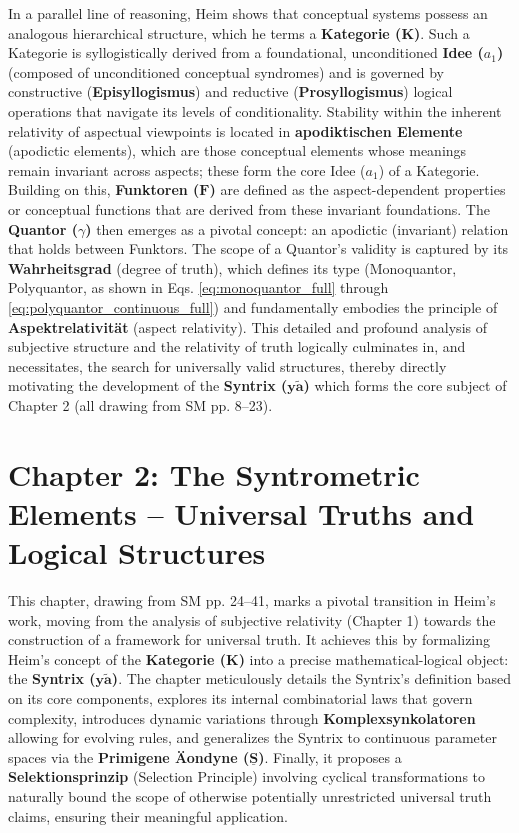 \documentclass[12pt]{article}
\newcommand{\kategorie}{\bm{K}}
\newcommand{\syntrix}{\bm{y\widetilde{a}}}
\newcommand{\conceptualsyndrome}{a} %
\newcommand{\funktor}{\bm{F}}
\begin{document}
In a parallel line of reasoning, Heim shows that conceptual systems possess an analogous hierarchical structure, which he terms a \textbf{Kategorie (\(\kategorie\))}. Such a Kategorie is syllogistically derived from a foundational, unconditioned \textbf{Idee (\(\conceptualsyndrome_1\))} (composed of unconditioned conceptual syndromes) and is governed by constructive (\textbf{Episyllogismus}) and reductive (\textbf{Prosyllogismus}) logical operations that navigate its levels of conditionality. Stability within the inherent relativity of aspectual viewpoints is located in \textbf{apodiktischen Elemente} (apodictic elements), which are those conceptual elements whose meanings remain invariant across aspects; these form the core Idee (\(\conceptualsyndrome_1\)) of a Kategorie. Building on this, \textbf{Funktoren (\(\funktor\))} are defined as the aspect-dependent properties or conceptual functions that are derived from these invariant foundations. The \textbf{Quantor (\(\gamma\))} then emerges as a pivotal concept: an apodictic (invariant) relation that holds between Funktors. The scope of a Quantor's validity is captured by its \textbf{Wahrheitsgrad} (degree of truth), which defines its type (Monoquantor, Polyquantor, as shown in Eqs. \eqref{eq:monoquantor_full} through \eqref{eq:polyquantor_continuous_full}) and fundamentally embodies the principle of \textbf{Aspektrelativität} (aspect relativity). This detailed and profound analysis of subjective structure and the relativity of truth logically culminates in, and necessitates, the search for universally valid structures, thereby directly motivating the development of the \textbf{Syntrix (\(\syntrix\))} which forms the core subject of Chapter 2 (all drawing from SM pp. 8--23).

\clearpage

\section{Chapter 2: The Syntrometric Elements – Universal Truths and Logical Structures}
\label{sec:chapter2}

This chapter, drawing from SM pp. 24--41, marks a pivotal transition in Heim's work, moving from the analysis of subjective relativity (Chapter 1) towards the construction of a framework for universal truth. It achieves this by formalizing Heim's concept of the \textbf{Kategorie (\(\kategorie\))} into a precise mathematical-logical object: the \textbf{Syntrix (\(\syntrix\))}. The chapter meticulously details the Syntrix's definition based on its core components, explores its internal combinatorial laws that govern complexity, introduces dynamic variations through \textbf{Komplexsynkolatoren} allowing for evolving rules, and generalizes the Syntrix to continuous parameter spaces via the \textbf{Primigene \"{A}ondyne (\(\underline{\bm{S}}\))}. Finally, it proposes a \textbf{Selektionsprinzip} (Selection Principle) involving cyclical transformations to naturally bound the scope of otherwise potentially unrestricted universal truth claims, ensuring their meaningful application.
\end{document}
